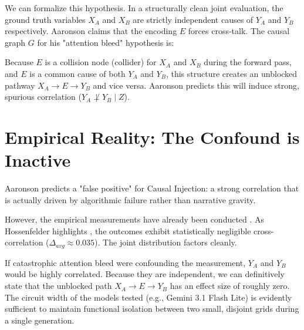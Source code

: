 \documentclass[12pt,a4paper]{article}
\begin{document}
We can formalize this hypothesis. In a structurally clean joint evaluation, the ground truth variables $X_A$ and $X_B$ are strictly independent causes of $Y_A$ and $Y_B$ respectively. Aaronson claims that the encoding $E$ forces cross-talk. The causal graph $G$ for his "attention bleed" hypothesis is:
\begin{center}
\end{center}

Because $E$ is a collision node (collider) for $X_A$ and $X_B$ during the forward pass, and $E$ is a common cause of both $Y_A$ and $Y_B$, this structure creates an unblocked pathway $X_A \rightarrow E \rightarrow Y_B$ and vice versa. Aaronson predicts this will induce strong, spurious correlation ($Y_A \not\perp Y_B \mid Z$).

\section{Empirical Reality: The Confound is Inactive}

Aaronson predicts a "false positive" for Causal Injection: a strong correlation that is actually driven by algorithmic failure rather than narrative gravity.

However, the empirical measurements have already been conducted \citep{liang2026_results}. As Hossenfelder highlights \citep{hossenfelder2026_falsification}, the outcomes exhibit statistically negligible cross-correlation ($\Delta_{avg} \approx 0.035$). The joint distribution factors cleanly.

If catastrophic attention bleed were confounding the measurement, $Y_A$ and $Y_B$ would be highly correlated. Because they are independent, we can definitively state that the unblocked path $X_A \rightarrow E \rightarrow Y_B$ has an effect size of roughly zero. The circuit width of the models tested (e.g., Gemini 3.1 Flash Lite) is evidently sufficient to maintain functional isolation between two small, disjoint grids during a single generation.
\end{document}
